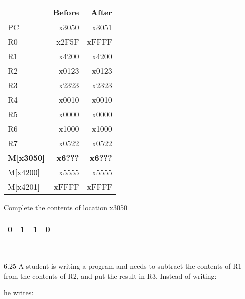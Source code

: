 \documentclass{patt}
\begin{document}
\begin{exercises}
\begin{center}
\begin{tabular}{|l|r|r|}
\hline
 & Before & After \\ \hline \hline
PC & x3050 & x3051 \\ \hline
R0 & x2F5F & xFFFF \\ \hline
R1 & x4200 & x4200 \\ \hline
R2 & x0123 & x0123 \\ \hline
R3 & x2323 & x2323 \\ \hline
R4 & x0010 & x0010 \\ \hline
R5 & x0000 & x0000 \\ \hline
R6 & x1000 & x1000 \\ \hline
R7 &      x0522 &  x0522 \\ \hline
\textbf{M[x3050]} & \textbf{x6???} &  \textbf{x6???} \\ \hline
M[x4200]& x5555 &  x5555 \\ \hline
M[x4201]& xFFFF &  xFFFF \\ \hline

\end{tabular}
\end{center}

\noindent
Complete the contents of location x3050 \\

\begin{tabular}{|@{}c|@{}c|@{}c|@{}c|c|c|c|c|c|c|c|c|c|c|c|c|}
\hline
0&1&1&0& &{ }&{ }&{ }&{ }&{ }&{ }&{ }&{ }&{ }&{ }&{ }\\ 
\hline 
\end{tabular}\\

\item[6.25] A student is writing a program and needs to subtract the contents of R1
from the contents of R2, and put the result in R3.  Instead of writing:

\begin{center}
\begin{minipage}[t]{0.5\linewidth}
\end{minipage}
\end{center}

\noindent
he writes:


\end{exercises}
\end{document}
